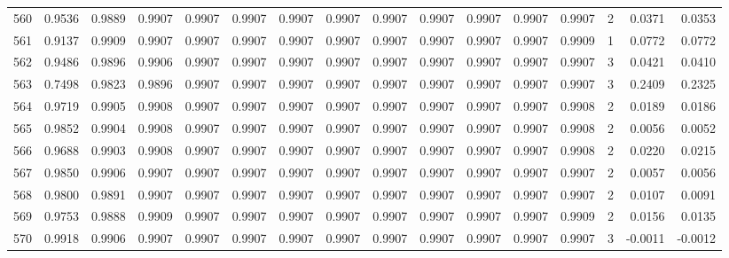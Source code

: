 \begin{tabular}{lrrrrrrrrrrrrrrr}
560 &      0.9536 &  0.9889 &  0.9907 &  0.9907 &  0.9907 &  0.9907 &  0.9907 &  0.9907 &  0.9907 &  0.9907 &   0.9907 &     0.9907 &      2 &                    0.0371 &                     0.0353 \\
561 &      0.9137 &  0.9909 &  0.9907 &  0.9907 &  0.9907 &  0.9907 &  0.9907 &  0.9907 &  0.9907 &  0.9907 &   0.9907 &     0.9909 &      1 &                    0.0772 &                     0.0772 \\
562 &      0.9486 &  0.9896 &  0.9906 &  0.9907 &  0.9907 &  0.9907 &  0.9907 &  0.9907 &  0.9907 &  0.9907 &   0.9907 &     0.9907 &      3 &                    0.0421 &                     0.0410 \\
563 &      0.7498 &  0.9823 &  0.9896 &  0.9907 &  0.9907 &  0.9907 &  0.9907 &  0.9907 &  0.9907 &  0.9907 &   0.9907 &     0.9907 &      3 &                    0.2409 &                     0.2325 \\
564 &      0.9719 &  0.9905 &  0.9908 &  0.9907 &  0.9907 &  0.9907 &  0.9907 &  0.9907 &  0.9907 &  0.9907 &   0.9907 &     0.9908 &      2 &                    0.0189 &                     0.0186 \\
565 &      0.9852 &  0.9904 &  0.9908 &  0.9907 &  0.9907 &  0.9907 &  0.9907 &  0.9907 &  0.9907 &  0.9907 &   0.9907 &     0.9908 &      2 &                    0.0056 &                     0.0052 \\
566 &      0.9688 &  0.9903 &  0.9908 &  0.9907 &  0.9907 &  0.9907 &  0.9907 &  0.9907 &  0.9907 &  0.9907 &   0.9907 &     0.9908 &      2 &                    0.0220 &                     0.0215 \\
567 &      0.9850 &  0.9906 &  0.9907 &  0.9907 &  0.9907 &  0.9907 &  0.9907 &  0.9907 &  0.9907 &  0.9907 &   0.9907 &     0.9907 &      2 &                    0.0057 &                     0.0056 \\
568 &      0.9800 &  0.9891 &  0.9907 &  0.9907 &  0.9907 &  0.9907 &  0.9907 &  0.9907 &  0.9907 &  0.9907 &   0.9907 &     0.9907 &      2 &                    0.0107 &                     0.0091 \\
569 &      0.9753 &  0.9888 &  0.9909 &  0.9907 &  0.9907 &  0.9907 &  0.9907 &  0.9907 &  0.9907 &  0.9907 &   0.9907 &     0.9909 &      2 &                    0.0156 &                     0.0135 \\
570 &      0.9918 &  0.9906 &  0.9907 &  0.9907 &  0.9907 &  0.9907 &  0.9907 &  0.9907 &  0.9907 &  0.9907 &   0.9907 &     0.9907 &      3 &                   -0.0011 &                    -0.0012 \\

\end{tabular}
